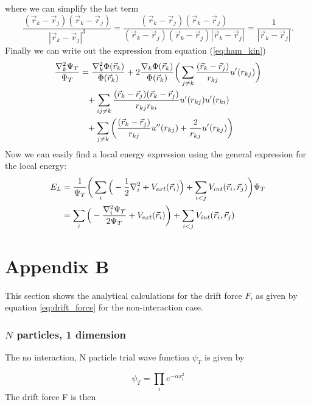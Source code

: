 \documentclass[norsk,a4paper,12pt]{article}
\begin{document}
where we can simplify the last term
\begin{equation}
\frac{(\vec{r}_k-\vec{r}_j)(\vec{r}_k-\vec{r}_j)}{|\vec{r}_k-\vec{r}_j|^3}=\frac{(\vec{r}_k - \vec{r}_j)(\vec{r}_k - \vec{r}_j)}{(\vec{r}_k - \vec{r}_j)(\vec{r}_k - \vec{r}_j)|\vec{r}_k - \vec{r}_j|}=\frac{1}{|\vec{r}_k - \vec{r}_j|}.
\end{equation}
Finally we can write out the expression from equation (\ref{eq:ham_kin}) 
\begin{align}
\frac{\nabla_k^2\Psi_T}{\Psi_T}&=\frac{\nabla_k^2\Phi(\vec{r}_k)}{\Phi(\vec{r}_k)} + 2\frac{\nabla_k\Phi(\vec{r}_k)}{\Phi(\vec{r}_k)}\bigg(\sum_{j\neq k}\frac{(\vec{r}_k-\vec{r}_j)}{r_{kj}}u'(r_{kj})\bigg)\notag\\
&\phantom{=}+\sum_{ij\neq k}\frac{(\vec{r}_k-\vec{r}_j)(\vec{r}_k-\vec{r}_j)}{r_{kj}r_{ki}}u'(r_{kj})u'(r_{ki})\\
&\phantom{=}+\sum_{j\neq k}\bigg(\frac{(\vec{r}_k-\vec{r}_j)}{r_{kj}}u''(r_{kj})+\frac{2}{r_{kj}}u'(r_{kj})\bigg)\notag
\end{align}
Now we can easily find a local energy expression using the general expression for the local energy:
\begin{align}
E_L&=\frac{1}{\Psi_T}\bigg(\sum_i\Big(-\frac{1}{2}\nabla_i^2+V_{ext}(\vec{r}_i)\Big) + \sum_{i<j}V_{int}(\vec{r}_i,\vec{r}_j)\bigg)\Psi_T\notag\\
&=\sum_i\Big(-\frac{\nabla_i^2\Psi_T}{2\Psi_T}+V_{ext}(\vec{r}_i)\bigg)+\sum_{i<j}V_{int}(\vec{r}_i,\vec{r}_j)
\end{align}

\section*{Appendix B} \label{sec:appendix_b}

This section shows the analytical calculations for the drift force $F$, as given by equation \ref{eq:drift_force} for the non-interaction case.

\subsubsection{$N$ particles, 1 dimension}

The no interaction, N particle trial wave function $\psi_T$ is given by

\begin{equation}
\psi_T =	\prod_i e^{-\alpha x_i^2}
\end{equation}
The drift force F is then
\end{document}
